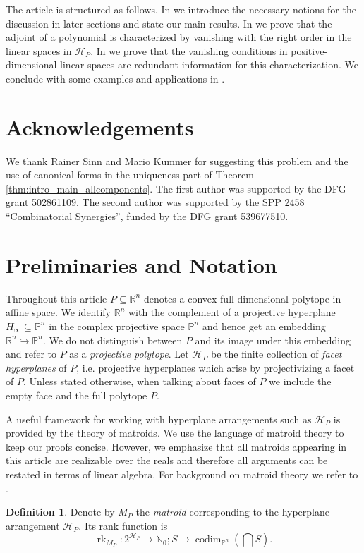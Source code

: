 \documentclass[a4paper,10pt]{amsart}
\theoremstyle{definition}
\newtheorem{defin}{Definition}[section]
\theoremstyle{plain}
\newcommand{\codim}{\operatorname{codim}}
\newcommand{\rk}{\operatorname{rk}}
\newcommand{\cH}{{\mathcal H}}
\newcommand{\R}{{\mathbb R}}
\newcommand{\pp}{\mathbb{P}}
\newcommand{\N}{{\mathbb N}}
\begin{document}
The article is structured as follows. In  we introduce the necessary notions for the discussion in later sections and state our main results. In  we prove that the adjoint of a polynomial is characterized by vanishing with the right order in the linear spaces in $\cH_P$. In  we prove that the vanishing conditions in positive-dimensional linear spaces are redundant information for this characterization. We conclude with some examples and applications in .


\section{Acknowledgements}
We thank Rainer Sinn and Mario Kummer for suggesting this problem and the use of canonical forms in the uniqueness part of Theorem \ref{thm:intro_main_allcomponents}. The first author was supported by the DFG grant 502861109. The second author was supported by the SPP 2458 “Combinatorial Synergies”,
funded by the DFG grant 539677510.

\section{Preliminaries and Notation} \label{sec: def}

Throughout this article $P \subseteq \R^n$ denotes a convex full-dimensional polytope in affine space. We identify $\R^n$ with the complement of a projective hyperplane $H_\infty\subseteq \pp^n$ in the complex projective space $\pp^n$ and hence get an embedding $\R^n \hookrightarrow \pp^n$. We do not distinguish between $P$ and its image under this embedding and refer to $P$ as a \emph{projective polytope}. Let $\cH_P$ be the finite collection of \emph{facet hyperplanes} of $P$, i.e. projective hyperplanes which arise by projectivizing a facet of $P$. Unless stated otherwise, when talking about faces of $P$ we include the empty face and the full polytope $P$.

A useful framework for working with hyperplane arrangements such as $\cH_P$ is provided by the theory of matroids. We use the language of matroid theory to keep our proofs concise. However, we emphasize that all matroids appearing in this article are realizable over the reals and therefore all arguments can be restated in terms of linear algebra. For background on matroid theory we refer to \cite{Oxley2011Matroids}.
\begin{defin}
 Denote by $M_P$ the \emph{matroid} corresponding to the hyperplane arrangement $\cH_P$. Its rank function is
 \begin{equation*}
     \rk_{M_P} \colon 2^{\cH_P} \to \N_0;
     S \mapsto \codim_{\pp^n}\left(\bigcap S\right).
 \end{equation*}
\end{defin}
\end{document}
